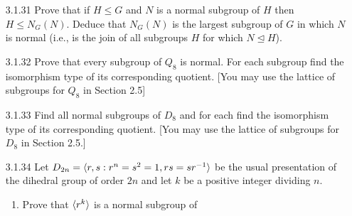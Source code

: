\begin{enumerate}
      \textbf{Proof.} ($\Rightarrow$) Suppose first that $gN = Ng$. Let
      $n \in N$. Then since $ng \in Ng$ and $gN = Ng$, it follows that
      $ng = gn'$ for some $n' \in N$, so that $n = gn'g^{-1} \in gNg^{-1}$;
      i.e., $N \subseteq gNg^{-1}$. Now consider $m \in gNg^{-1}$. It follows
      that $m = gn''g^{-1}$ for some $n'' \in N$. Similarly, since $gn'' \in gN$
      and $gN = Ng$, we have that $gn'' = n_1g$ for some $n_1 \in N$, so that
      $m = gn''g^{-1} = n_1 \in N$. Thus, $gNg^{-1} \subseteq N$; conclude that
      $gNg^{-1} = N$; in other words, $g \in N_G(N)$.

      ($\Leftarrow$) Now suppose that $g \in N_G(N)$. By definition, we have
      that $gNg^{-1} = N$. Let $m \in gN$, so that $m = gn$ for some $n \in N$.
      It follows that $gng^{-1} = n'$ for some $n' \in N$ (because
      $gNg^{-1} = N$), so that $m = gn = n'g \in Ng$; that is $gN \subseteq Ng$.
      By a symmetric argument, we conclude that $Ng \subseteq gN$, so that
      $gN = Ng$. \qed
   \item[3.1.31]  Prove that if $H \le G$ and $N$ is a normal subgroup of $H$
                  then $H \le N_G(N)$. Deduce that $N_G(N)$ is the largest
                  subgroup of $G$ in which $N$ is normal (i.e., is the join of
                  all subgroups $H$ for which $N \trianglelefteq H$).
   \item[3.1.32]  Prove that every subgroup of $Q_8$ is normal. For each
                  subgroup find the isomorphism type of its corresponding
                  quotient. [You may use the lattice of subgroups for $Q_8$ in
                  Section 2.5]
   \item[3.1.33]  Find all normal subgroups of $D_8$ and for each find the
                  isomorphism type of its corresponding quotient. [You may use
                  the lattice of subgroups for $D_8$ in Section 2.5.]
   \item[3.1.34]  Let $D_{2n} = \langle r, s : r^n = s^2 = 1, rs = sr^{-1} \rangle$ be the
                  usual presentation of the dihedral group of order $2n$ and let
                  $k$ be a positive integer dividing $n$.
                  \begin{enumerate}
                     \item Prove that $\langle r^k \rangle$ is a normal subgroup of

\end{enumerate}
\end{enumerate}
